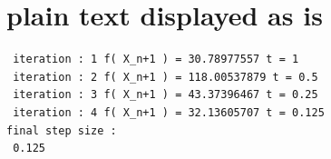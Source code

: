 \documentclass[14pt]{extarticle} %
\begin{document}
\section{plain text displayed as is }
\begin{small}
  \begin{verbatim}
 iteration : 1 f( X_n+1 ) = 30.78977557 t = 1
 iteration : 2 f( X_n+1 ) = 118.00537879 t = 0.5
 iteration : 3 f( X_n+1 ) = 43.37396467 t = 0.25
 iteration : 4 f( X_n+1 ) = 32.13605707 t = 0.125
final step size :
 0.125
  \end{verbatim}
\end{small}
\end{document}
